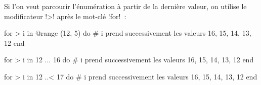 Si l'on veut parcourir l'énumération à partir de la dernière valeur, on utilise le modificateur \ggsq!>! après le mot-clé \ggsq!for!~:
\begin{galgas34}
for > i in @range (12, 5) do
  # i prend successivement les valeurs 16, 15, 14, 13, 12
end
\end{galgas34}

\begin{galgas34}
for > i in 12 ... 16 do
  # i prend successivement les valeurs 16, 15, 14, 13, 12
end
\end{galgas34}

\begin{galgas34}
for > i in 12 ..< 17 do
  # i prend successivement les valeurs 16, 15, 14, 13, 12
end
\end{galgas34}


